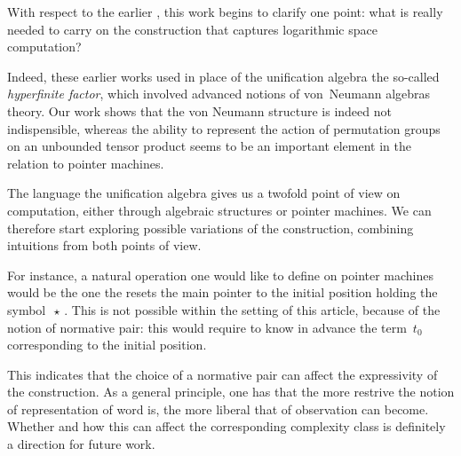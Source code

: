 With respect to the earlier \cite{girard_normativity_2012,aubert_characterizing_2012,seiller_logarithmic_2013},
this work begins to clarify one point: what is really needed to carry on the construction that captures logarithmic space computation?

Indeed, these earlier works used in place of the unification algebra the so-called \emph{hyperfinite factor},
which involved advanced notions of von~Neumann algebras theory.
Our work shows that the von Neumann structure is indeed not indispensible,
whereas the ability to represent the action of permutation groups on an unbounded tensor product seems to be an important element in the relation to pointer machines.

\smallskip
The language the unification algebra gives us a twofold point of view on computation, either through algebraic structures or pointer machines. We can therefore start exploring possible variations of the construction, combining intuitions from both points of view.

For instance, a natural operation one would like to define on pointer machines would be the one the resets the main pointer to the initial position holding the symbol $\,\star\,$.
This is not possible within the setting of this article, because of the notion of normative pair:
this would require to know in advance the term $\,t_0\,$ corresponding to the initial position.

\smallskip
This indicates that the choice of a normative pair can affect the expressivity of the construction.
As a general principle, one has that the more restrive the notion of representation of word is,
the more liberal that of observation can become.
Whether and how this can affect the corresponding complexity class is definitely a direction for future work.
